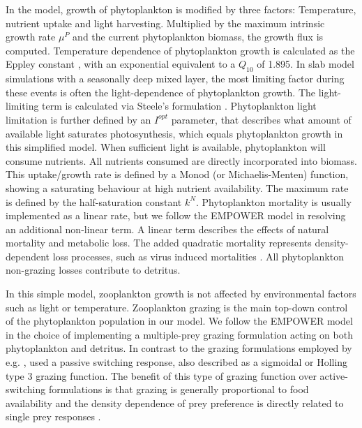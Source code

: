 \documentclass[journal abbreviations, manuscript]{copernicus}
\begin{document}
In the model, growth of phytoplankton is modified by three factors: Temperature, nutrient uptake and light harvesting. Multiplied by the maximum intrinsic growth rate $\mu^P$ and the current phytoplankton biomass, the growth flux is computed. 
Temperature dependence of phytoplankton growth is calculated as the Eppley constant \citep{Eppley1972TemperatureSea}, with an exponential equivalent to a $Q_{10}$ of 1.895.
In slab model simulations with a seasonally deep mixed layer, the most limiting factor during these events is often the light-dependence of phytoplankton growth. The light-limiting term is calculated via Steele's formulation \citep{Steele1962EnvironmentalSea}. Phytoplankton light limitation is further defined by an $I^{opt}$ parameter, that describes what amount of available light saturates photosynthesis, which equals phytoplankton growth in this simplified model.
When sufficient light is available, phytoplankton will consume nutrients. All nutrients consumed are directly incorporated into biomass. This uptake/growth rate is defined by a Monod (or Michaelis-Menten) function, showing a saturating behaviour at high nutrient availability. The maximum rate is defined by the half-saturation constant $k^N$. 
Phytoplankton mortality is usually implemented as a linear rate, but we follow the EMPOWER model in resolving an additional non-linear term. A linear term describes the effects of natural mortality and metabolic loss. The added quadratic mortality represents density-dependent loss processes, such as virus induced mortalities \citep{Anderson2015c}.  
All phytoplankton non-grazing losses contribute to detritus.




In this simple model, zooplankton growth is not affected by environmental factors such as light or temperature.
Zooplankton grazing is the main top-down control of the phytoplankton population in our model. We follow the EMPOWER model in the choice of implementing a multiple-prey grazing formulation acting on both phytoplankton and detritus. In contrast to the grazing formulations employed by e.g. \cite{Fasham1990a}, \citeauthor{Anderson2015c} used a passive switching response, also described as a sigmoidal or Holling type 3 grazing function. The benefit of this type of grazing function over active-switching formulations is that grazing is generally proportional to food availability and the density dependence of prey preference is directly related to single prey responses \citep{Gentleman2003a}.
\end{document}
